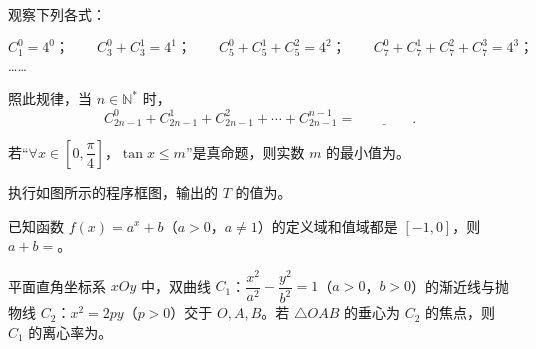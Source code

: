 \begin{question}

观察下列各式：

\nopagebreak[4]
\[
C_{1}^{0}=4^0\text{；}\qquad
C_{3}^{0}+C_{3}^{1}=4^1\text{；}\qquad
C_{5}^{0}+C_{5}^{1}+C_{5}^{2}=4^2\text{；}\qquad
C_{7}^{0}+C_{7}^{1}+C_{7}^{2}+C_{7}^{3}=4^3\text{；}
\]
……

照此规律，当 $n\in\mathbb{N}^*$ 时，
\nopagebreak[4]
\[
C_{2n-1}^{0}+C_{2n-1}^{1}+C_{2n-1}^{2}+\cdots+C_{2n-1}^{n-1}=\underline{\qquad\qquad}.
\]

\end{question}
\begin{question}

若“$\forall x\in\left[0,\dfrac{\pi}{4}\right]$，$\tan x\leqslant m$”是真命题，则实数 $m$ 的最小值为\gkblank{}。

\Needspace{0.4\textheight}
\end{question}
\begin{question}

执行如图所示的程序框图，输出的 $T$ 的值为\gkblank{}。
\nopagebreak[4]
\begin{center}\end{center}
\nopagebreak[4]
\end{question}
\begin{question}

已知函数 $f(x)=a^x+b$（$a>0$，$a\ne 1$）的定义域和值域都是 $[-1,0]$，则 $a+b=$\gkblank{}。

\end{question}
\begin{question}

平面直角坐标系 $xOy$ 中，双曲线 $C_1$：$\dfrac{x^2}{a^2}-\dfrac{y^2}{b^2}=1$（$a>0$，$b>0$）的渐近线与抛物线 $C_2$：$x^2=2py$（$p>0$）交于 $O,A,B$。若 $\triangle OAB$ 的垂心为 $C_2$ 的焦点，则 $C_1$ 的离心率为\gkblank{}。

\end{question}

